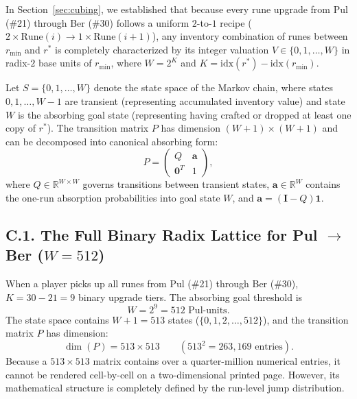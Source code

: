 \documentclass[11pt,reqno]{amsart}
\theoremstyle{definition}
\begin{document}
In Section~\ref{sec:cubing}, we established that because every rune upgrade from Pul (\#21) through Ber (\#30) follows a uniform $2$-to-$1$ recipe ($2 \times \text{Rune}(i) \to 1 \times \text{Rune}(i+1)$), any inventory combination of runes between $r_{\min}$ and $r^*$ is completely characterized by its integer valuation $V \in \{0, 1, \dots, W\}$ in radix-$2$ base units of $r_{\min}$, where $W = 2^K$ and $K = \text{idx}(r^*) - \text{idx}(r_{\min})$.

Let $S = \{0, 1, \dots, W\}$ denote the state space of the Markov chain, where states $0, 1, \dots, W-1$ are transient (representing accumulated inventory value) and state $W$ is the absorbing goal state (representing having crafted or dropped at least one copy of $r^*$). The transition matrix $P$ has dimension $(W+1) \times (W+1)$ and can be decomposed into canonical absorbing form:
\begin{equation}
\label{eq:app_canonical_P}
    P = \begin{pmatrix}
        Q & \mathbf{a} \\
        \mathbf{0}^T & 1
    \end{pmatrix},
\end{equation}
where $Q \in \mathbb{R}^{W \times W}$ governs transitions between transient states, $\mathbf{a} \in \mathbb{R}^W$ contains the one-run absorption probabilities into goal state $W$, and $\mathbf{a} = (\mathbf{I} - Q)\mathbf{1}$.

\subsection{C.1. The Full Binary Radix Lattice for Pul $\to$ Ber ($W = 512$)}
When a player picks up all runes from Pul (\#21) through Ber (\#30), $K = 30 - 21 = 9$ binary upgrade tiers. The absorbing goal threshold is
\[
    W = 2^9 = 512\text{ Pul-units}.
\]
The state space contains $W + 1 = 513$ states ($\{0, 1, 2, \dots, 512\}$), and the transition matrix $P$ has dimension:
\[
    \dim(P) = 513 \times 513 \qquad \left(513^2 = 263{,}169\text{ entries}\right).
\]
Because a $513 \times 513$ matrix contains over a quarter-million numerical entries, it cannot be rendered cell-by-cell on a two-dimensional printed page. However, its mathematical structure is completely defined by the run-level jump distribution. 
\end{document}
